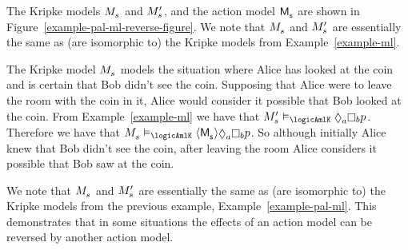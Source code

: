\begin{example}
The Kripke models $\kPModel{\kStateS}$ and $\kPModelP{\kStateS}$, and the action model $\aPModel{\aStateS}$ are shown in Figure~\ref{example-pal-ml-reverse-figure}.
We note that $\kPModel{\kStateS}$ and $\kPModelP{\kStateS}$ are essentially the same as (are isomorphic to) the Kripke models from Example~\ref{example-ml}.

The Kripke model $\kPModel{\kStateS}$ models the situation where Alice has looked at the coin and is certain that Bob didn't see the coin.
Supposing that Alice were to leave the room with the coin in it, Alice would consider it possible that Bob looked at the coin.
From Example~\ref{example-ml} we have that $\kPModelP{\kStateS} \entails_\logicAmlK \possibleA \knowsB \atomP$.
Therefore we have that $\kPModel{\kStateS} \entails_\logicAmlK \actionE{\aPModel{\aStateS}} \possibleA \knowsB \atomP$.
So although initially Alice knew that Bob didn't see the coin, after leaving the room Alice considers it possible that Bob saw at the coin.

We note that $\kPModel{\kStateS}$ and $\kPModelP{\kStateS}$ are essentially the same as (are isomorphic to) the Kripke models from the previous example, Example~\ref{example-pal-ml}.
This demonstrates that in some situations the effects of an action model can be reversed by another action model. 
\end{example}

